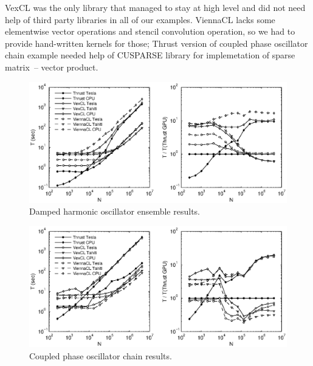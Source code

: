 \documentclass[1p]{elsarticle}
\begin{document}
VexCL was the only library that managed to stay at high level and did not need
help of third party libraries in all of our examples. ViennaCL lacks some
elementwise vector operations and stencil convolution operation, so we had to
provide hand-written kernels for those; Thrust version of coupled phase
oscillator chain example needed help of CUSPARSE library for implemetation of
sparse matrix~-- vector product.

\begin{figure}[p]
    \begin{center}
        \includegraphics[width=\textwidth]{data/damped_oscillator/perfcmp}
    \end{center}
    \caption{Damped harmonic oscillator ensemble results.}
    \label{fig:damped:perf}
\end{figure}

\begin{figure}[p]
    \begin{center}
        \includegraphics[width=\textwidth]{data/phase_oscillator_chain/perfcmp}
    \end{center}
    \caption{Coupled phase oscillator chain results.}
    \label{fig:phase:perf}
\end{figure}
\end{document}
